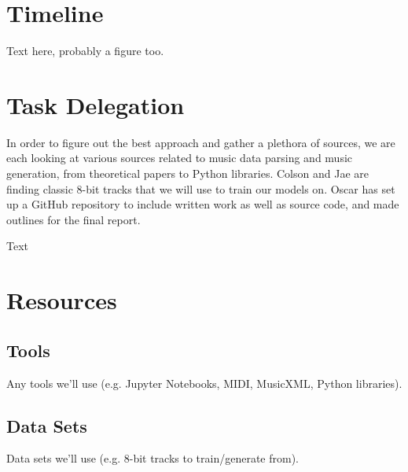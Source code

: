 \documentclass{article}
\begin{document}
\section{Timeline}
Text here, probably a figure too. 

\section{Task Delegation}
In order to figure out the best approach and gather a plethora of sources, we are each looking at various sources related to music data parsing and music generation, 
from theoretical papers to Python libraries. Colson and Jae are finding classic 8-bit tracks that we will use to train our models on. Oscar has set up a GitHub repository 
to include written work as well as source code, and made outlines for the final report. 

Text

\section{Resources}

\subsection{Tools}
Any tools we'll use (e.g. Jupyter Notebooks, MIDI, MusicXML, Python libraries).

\subsection{Data Sets}
Data sets we'll use (e.g. 8-bit tracks to train/generate from).



\end{document}
